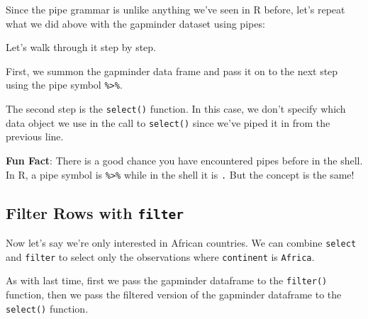 \documentclass[]{book}
\newenvironment{Shaded}{\begin{snugshade}}{\end{snugshade}}
\newcommand{\KeywordTok}[1]{\textcolor[rgb]{0.13,0.29,0.53}{\textbf{#1}}}
\newcommand{\NormalTok}[1]{#1}
\newcommand{\OperatorTok}[1]{\textcolor[rgb]{0.81,0.36,0.00}{\textbf{#1}}}
\newcommand{\StringTok}[1]{\textcolor[rgb]{0.31,0.60,0.02}{#1}}
\begin{document}
Since the pipe grammar is unlike anything we've seen in R before, let's repeat what
we did above with the gapminder dataset using pipes:

\begin{Shaded}
\end{Shaded}

Let's walk through it step by step.

First, we summon the gapminder data frame and pass it on to the next step using the pipe symbol \texttt{\%\textgreater{}\%}.

The second step is the \texttt{select()} function. In this case, we don't specify which data object we use in the call to \texttt{select()} since we've piped it in from the previous line.

\textbf{Fun Fact}: There is a good chance you have encountered pipes before in the shell. In R, a pipe symbol is \texttt{\%\textgreater{}\%} while in the shell it is \texttt{\textbar{}.} But the concept is the same!

\hypertarget{filter-rows-with-filter}{%
\subsection{\texorpdfstring{Filter Rows with \texttt{filter}}{Filter Rows with filter}}\label{filter-rows-with-filter}}

Now let's say we're only interested in African countries. We can combine \texttt{select} and \texttt{filter} to select only the observations where \texttt{continent} is \texttt{Africa}.

\begin{Shaded}
\end{Shaded}

As with last time, first we pass the gapminder dataframe to the \texttt{filter()} function, then we pass the filtered version of the gapminder dataframe to the \texttt{select()} function.
\end{document}
